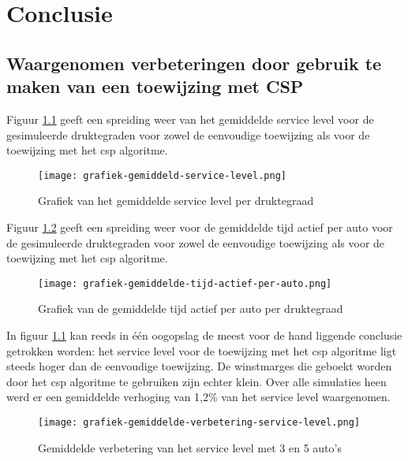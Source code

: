 
\chapter{Conclusie}
\label{ch:conclusie}

\section{Waargenomen verbeteringen door gebruik te maken van een toewijzing met CSP}
Figuur \ref{grafiek:gemiddeld-service-level} geeft een spreiding weer van het gemiddelde service level voor de gesimuleerde druktegraden voor zowel de eenvoudige toewijzing als voor de toewijzing met het csp algoritme. 
\begin{figure}[h]
	\texttt{[image: grafiek-gemiddeld-service-level.png]}
	\caption[Grafiek van het gemiddelde service level per druktegraad]{Grafiek van het gemiddelde service level per druktegraad}
	\label{grafiek:gemiddeld-service-level}
\end{figure}
Figuur \ref{grafiek:gemiddelde-tijd-actief-per-auto} geeft een spreiding weer voor de gemiddelde tijd actief per auto voor de gesimuleerde druktegraden voor zowel de eenvoudige toewijzing als voor de toewijzing met het csp algoritme.
\begin{figure}[h]
	\texttt{[image: grafiek-gemiddelde-tijd-actief-per-auto.png]}
	\caption[Grafiek van de gemiddelde tijd actief per auto per druktegraad]{Grafiek van de gemiddelde tijd actief per auto per druktegraad}
	\label{grafiek:gemiddelde-tijd-actief-per-auto}
\end{figure}
In figuur \ref{grafiek:gemiddeld-service-level} kan reeds in één oogopslag de meest voor de hand liggende conclusie getrokken worden: het service level voor de toewijzing met het csp algoritme ligt steeds hoger dan de eenvoudige toewijzing. De winstmarges die geboekt worden door het csp algoritme te gebruiken zijn echter klein. Over alle simulaties heen werd er een gemiddelde verhoging van 1,2\% van het service level waargenomen. 
\begin{figure}[h]
	\texttt{[image: grafiek-gemiddelde-verbetering-service-level.png]}
	\caption[Grafiek van de gemiddelde verbetering van het service level]{Gemiddelde verbetering van het service level met 3 en 5 auto's}
	\label{grafiek:gemiddelde-verbetering-service-level}
\end{figure}
